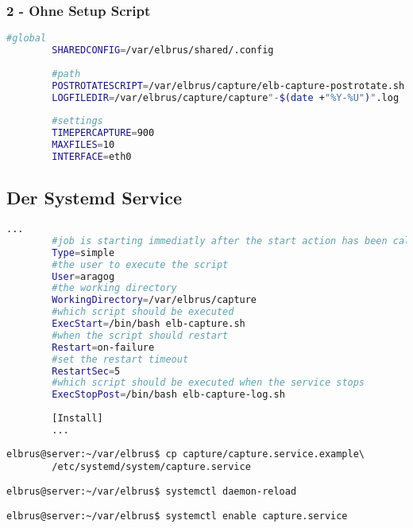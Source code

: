 \documentclass{article}
\begin{document}
	\subsubsection{2 - Ohne Setup Script}
	\lstset{style=files}
	\begin{lstlisting}[caption={Anhand von '.env.example' eigene '.env' Datei anlegen.}, language=bash]
		#global
		SHAREDCONFIG=/var/elbrus/shared/.config
		
		#path
		POSTROTATESCRIPT=/var/elbrus/capture/elb-capture-postrotate.sh
		LOGFILEDIR=/var/elbrus/capture/capture"-$(date +"%Y-%U")".log
		
		#settings
		TIMEPERCAPTURE=900
		MAXFILES=10
		INTERFACE=eth0
	\end{lstlisting}

	\newpage
	\subsection[systemd service]{Der Systemd Service}
	\begin{lstlisting}[caption={capture.service.example - Die Variable 'WorkingDirectory', Die Variable 'User' sowie die Variable 'ExecStopPost' anpassen.},language=bash ,keywords={WorkingDirectory, User, ExecStopPost}, keywordstyle=\color{red}, firstnumber=3]
		...
		#job is starting immediatly after the start action has been called
		Type=simple
		#the user to execute the script
		User=aragog
		#the working directory
		WorkingDirectory=/var/elbrus/capture
		#which script should be executed
		ExecStart=/bin/bash elb-capture.sh
		#when the script should restart
		Restart=on-failure
		#set the restart timeout
		RestartSec=5
		#which script should be executed when the service stops
		ExecStopPost=/bin/bash elb-capture-log.sh
		
		[Install]
		...
	\end{lstlisting}
	
	\lstset{style=commands}
	\begin{lstlisting}[caption={Kopieren des Serviceprogrammes.}]
		elbrus@server:~/var/elbrus$ cp capture/capture.service.example\
		/etc/systemd/system/capture.service
	\end{lstlisting}

	\begin{lstlisting}[caption={Neuladen des 'systemctl' Deamons.}]
		elbrus@server:~/var/elbrus$ systemctl daemon-reload
	\end{lstlisting}
	
	\begin{lstlisting}[caption={Aktivieren des Serviceprogrammes.}]
		elbrus@server:~/var/elbrus$ systemctl enable capture.service
	\end{lstlisting}
\end{document}
